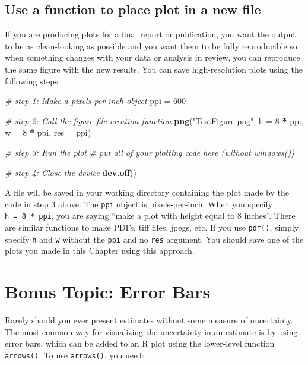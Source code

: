 \documentclass[]{book}
\newenvironment{Shaded}{\begin{snugshade}}{\end{snugshade}}
\newcommand{\KeywordTok}[1]{\textcolor[rgb]{0.13,0.29,0.53}{\textbf{#1}}}
\newcommand{\DataTypeTok}[1]{\textcolor[rgb]{0.13,0.29,0.53}{#1}}
\newcommand{\DecValTok}[1]{\textcolor[rgb]{0.00,0.00,0.81}{#1}}
\newcommand{\StringTok}[1]{\textcolor[rgb]{0.31,0.60,0.02}{#1}}
\newcommand{\CommentTok}[1]{\textcolor[rgb]{0.56,0.35,0.01}{\textit{#1}}}
\newcommand{\OperatorTok}[1]{\textcolor[rgb]{0.81,0.36,0.00}{\textbf{#1}}}
\newcommand{\NormalTok}[1]{#1}
\theoremstyle{definition}
\theoremstyle{definition}
\theoremstyle{definition}
\theoremstyle{remark}
\begin{document}
\subsection{Use a function to place plot in a new
file}\label{file-devices}

If you are producing plots for a final report or publication, you want
the output to be as clean-looking as possible and you want them to be
fully reproducible so when something changes with your data or analysis
in review, you can reproduce the same figure with the new results. You
can save high-resolution plots using the following steps:

\begin{Shaded}
\begin{Highlighting}[]
\CommentTok{# step 1: Make a pixels per inch object}
\NormalTok{ppi =}\StringTok{ }\DecValTok{600}

\CommentTok{# step 2: Call the figure file creation function}
\KeywordTok{png}\NormalTok{(}\StringTok{"TestFigure.png"}\NormalTok{, }\DataTypeTok{h =} \DecValTok{8} \OperatorTok{*}\StringTok{ }\NormalTok{ppi, }\DataTypeTok{w =} \DecValTok{8} \OperatorTok{*}\StringTok{ }\NormalTok{ppi, }\DataTypeTok{res =}\NormalTok{ ppi)}

\CommentTok{# step 3: Run the plot }
\CommentTok{# put all of your plotting code here (without windows())}

\CommentTok{# step 4: Close the device}
\KeywordTok{dev.off}\NormalTok{()}
\end{Highlighting}
\end{Shaded}

A file will be saved in your working directory containing the plot made
by the code in step 3 above. The \texttt{ppi} object is pixels-per-inch.
When you specify \texttt{h\ =\ 8\ *\ ppi}, you are saying ``make a plot
with height equal to 8 inches''. There are similar functions to make
PDFs, tiff files, jpegs, etc. If you use \texttt{pdf()}, simply specify
\texttt{h} and \texttt{w} without the \texttt{ppi} and no \texttt{res}
argument. You should save one of the plots you made in this Chapter
using this approach.

\section{Bonus Topic: Error Bars}\label{error-bars}

Rarely should you ever present estimates without some measure of
uncertainty. The most common way for visualizing the uncertainty in an
estimate is by using error bars, which can be added to an R plot using
the lower-level function \texttt{arrows()}. To use \texttt{arrows()},
you need:
\end{document}

